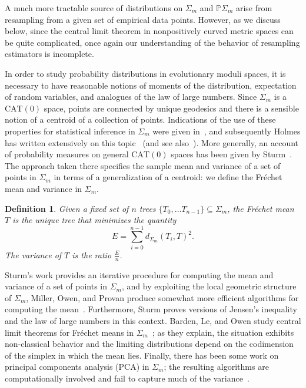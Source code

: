 \documentclass[a4paper,11pt]{article}
\newtheorem{definition}{Definition}
\newcommand{\CAT}{\textrm{CAT}}
\begin{document}
A much more tractable source of distributions on $\Sigma_m$ and $\mathbb{P}\Sigma_m$ arise from resampling from a given set of empirical data points.
However, as we discuss below, since the central limit theorem in nonpositively curved metric spaces can be quite complicated, once again our understanding of the behavior of resampling estimators is incomplete.

In order to study probability distributions in evolutionary moduli spaces, it is necessary to have reasonable notions of moments of the distribution, expectation of random variables, and analogues of the law of large numbers.
Since $\Sigma_m$ is a $\CAT(0)$ space, points are connected by unique geodesics and there is a sensible notion of a centroid of a collection of points.
Indications of the use of these properties for statistical inference in $\Sigma_m$ were given in~\cite{billera2001geometry}, and subsequently Holmes has written extensively on this topic~\cite{holmes2003bootstrapping, holmes2003bootstrapping, holmes2005statistical} (and see also~\cite{feragen2013tree}).
More generally, an account of probability measures on general $\CAT(0)$ spaces has been given by Sturm~\cite{sturm2003probability}.
The approach taken there specifies the sample mean and variance of a set of points in $\Sigma_m$ in terms of a generalization of a centroid: we define the Fr\'echet mean and variance in $\Sigma_m$.

\begin{definition}
Given a fixed set of $n$ trees $\{T_0, \ldots T_{n-1}\} \subseteq \Sigma_m$, the Fr\'echet mean $T$ is the unique tree that minimizes the quantity \[E = \sum_{i = 0}^{n-1} d_{\Sigma_m}(T_i, T)^2.\] 
The variance of $T$ is the ratio $\frac{E}{n}$.
\end{definition}

Sturm's work provides an iterative procedure for computing the mean and variance of a set of points in $\Sigma_m$, and by exploiting the local geometric structure of $\Sigma_m$, Miller, Owen, and Provan produce somewhat more efficient algorithms for computing the mean~\cite{miller2012polyhedral}.
Furthermore, Sturm proves versions of Jensen's inequality and the law of large numbers in this context.
Barden, Le, and Owen study central limit theorems for Fr\'echet means in $\Sigma_m$~\cite{barden2013mean}; as they explain, the situation exhibits non-classical behavior and the limiting distributions depend on the codimension of the simplex in which the mean lies.
Finally, there has been some work on principal components analysis (PCA) in $\Sigma_m$; the resulting algorithms are computationally involved and fail to capture much of the variance~\cite{Nye2011PCA}.
\end{document}
